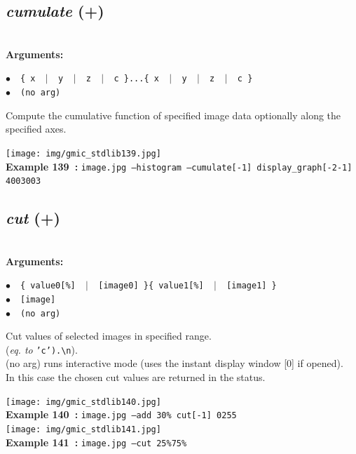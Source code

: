 \documentclass[a4paper,10.5pt,twoside]{book}
\def\comma{\discretionary{,}{}{,}}
\newcommand{\Cb}[1]{\textcolor{cb}{#1}}
\begin{document}
\subsection{\emph{cumulate} (+)}\vspace*{-0.7em}
~\\\textbf{\Cb{Arguments: }}\begin{flushleft}
{\small \Cb{\hspace*{0.5cm}$\bullet$~~\texttt{\{ x ~$|$~ y ~$|$~ z ~$|$~ c \}...\{ x ~$|$~ y ~$|$~ z ~$|$~ c \}}}}~~~\\
{\small \Cb{\hspace*{0.5cm}$\bullet$~~\texttt{(no arg)}}}\end{flushleft}
Compute the cumulative function of specified image data{\comma} optionally along the specified axes.
\begin{center}\texttt{[image: img/gmic\_stdlib139.jpg]}\\
{\footnotesize \textbf{Example 139~:} \texttt{image.jpg --histogram --cumulate[-1] display\_graph[-2{\comma}-1] 400{\comma}300{\comma}3}}
\end{center}

\subsection{\emph{cut} (+)}\vspace*{-0.7em}
~\\\textbf{\Cb{Arguments: }}\begin{flushleft}
{\small \Cb{\hspace*{0.5cm}$\bullet$~~\texttt{\{ value0[\%] ~$|$~ [image0] \}{\comma}\{ value1[\%] ~$|$~ [image1] \}}}}~~~\\
{\small \Cb{\hspace*{0.5cm}$\bullet$~~\texttt{[image]}}}~~~\\
{\small \Cb{\hspace*{0.5cm}$\bullet$~~\texttt{(no arg)}}}\end{flushleft}
Cut values of selected images in specified range.
~\\(\emph{eq. to} {\small \texttt{'c').\textbackslash n}}).
~\\(no arg) runs interactive mode (uses the instant display window [0] if opened).
~\\In this case{\comma} the chosen cut values are returned in the status.
\begin{center}\texttt{[image: img/gmic\_stdlib140.jpg]}\\
{\footnotesize \textbf{Example 140~:} \texttt{image.jpg --add 30\% cut[-1] 0{\comma}255}}
\\\texttt{[image: img/gmic\_stdlib141.jpg]}\\
{\footnotesize \textbf{Example 141~:} \texttt{image.jpg --cut 25\%{\comma}75\%}}
\end{center}
\end{document}
